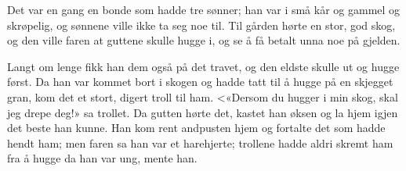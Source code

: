 \documentclass{article}
\begin{document}
\begin{mdframed}[
	linecolor=red,
	innerrightmargin = 0cm]
Det var en gang en bonde som hadde tre sønner; han var i små kår og gammel og skrøpelig, og sønnene ville ikke ta seg noe til. Til gården hørte en stor, god skog, og den ville faren at guttene skulle hugge i, og se å få betalt unna noe på gjelden.

Langt om lenge fikk han dem også på det travet, og den eldste skulle ut og hugge først. Da han var kommet bort i skogen og hadde tatt til å hugge på en skjegget gran, kom det et stort, digert troll til ham. <«Dersom du hugger i min skog, skal jeg drepe deg!» sa trollet. Da gutten hørte det, kastet han øksen og la hjem igjen det beste han kunne. Han kom rent andpusten hjem og fortalte det som hadde hendt ham; men faren sa han var et harehjerte; trollene hadde aldri skremt ham fra å hugge da han var ung, mente han.
\end{mdframed}
\end{document}

